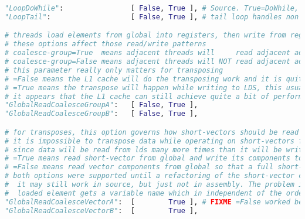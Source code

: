 \documentclass[]{article}
\begin{document}
\begin{lstlisting}[language=python,breaklines=true] "LoopDoWhile":                [ False, True ], # Source. True=DoWhile, False=For loop
"LoopTail":                   [ False, True ], # tail loop handles non multiples of unrolled summation loop

# threads load elements from global into registers, then write from registers to LDS
# these options affect those read/write patterns
# coalesce-group=True  means adjacent threads will     read adjacent addresses; if the data needs to be transposed then adjacent threads will NOT write adjacent elements to LDS.
# coalesce-group=False means adjacent threads will NOT read adjacent addresses; if the data needs to be transposed then adjacent threads will     write adjacent elements to LDS.
# this parameter really only matters for transposing
# =False means the L1 cache will do the transposing work and it is quite fast; then data is written coalesced (no bank conflicts) to LDS.
# =True means the transpose will happen while writing to LDS, this usually has bank conflicts, but it appears the throughput is still fast enough to not slow the VALUs down.
# it appears that the L1 cache can still achieve quite a bit of performance for GRCG=False, but overall it's usually faster to read coalesced
"GlobalReadCoalesceGroupA":   [ False, True ],
"GlobalReadCoalesceGroupB":   [ False, True ],

# for transposes, this option governs how short-vectors should be read from global and written to lds
# it is impossible to transpose data while operating on short-vectors for GlobalRead,LocalWrite and LocalRead; an odd number of those must be transposing and operating on vector components.
# since data will be read from lds many more times than it will be written, data must always end up in lds such that short-vectors can be read from lds
# =True means read short-vector from global and write its components to lds
# =False means read vector components from global so that a full short-vector can be written to lds
# both options were supported until a refactoring of the short-vector code (necessary to enable assembly) broke it. Since =True always seems to be faster, no time has been spend on fixing =False
#  it may still work in source, but just not in assembly. The problem is the order in which elements are stored into vgprs, is different than the order in which they are written to lds. In source each
#  loaded element gets a variable name which in independent of the order that they are written in the source code, but in assembly the values are just assigned vgprs in order and that order needs to be shuffles.
"GlobalReadCoalesceVectorA":  [        True ], # FIXME =False worked before the vector refactor; fixing requires re-ordering load/store indices; but they aren't the faster option so not worth time right now
"GlobalReadCoalesceVectorB":  [        True ],


\end{lstlisting}
\end{document}
